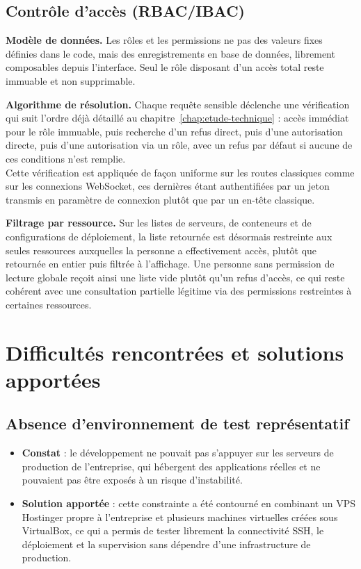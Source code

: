 \subsection{Contrôle d'accès (RBAC/IBAC)}

\textbf{Modèle de données.} Les rôles et les permissions ne pas
des valeurs fixes définies dans le code, mais des enregistrements en
base de données, librement composables depuis l'interface. Seul le rôle
disposant d'un accès total reste immuable et non supprimable.

\textbf{Algorithme de résolution.} Chaque requête sensible déclenche une
vérification qui suit l'ordre déjà détaillé au
chapitre~\ref{chap:etude-technique} : accès immédiat pour le rôle
immuable, puis recherche d'un refus direct, puis d'une autorisation
directe, puis d'une autorisation via un rôle, avec un refus par défaut
si aucune de ces conditions n'est remplie. \\ 
Cette vérification est appliquée de façon uniforme sur les routes classiques comme sur les
connexions WebSocket, ces dernières étant authentifiées par un jeton
transmis en paramètre de connexion plutôt que par un en-tête classique.

\textbf{Filtrage par ressource.} Sur les listes de serveurs, de
conteneurs et de configurations de déploiement, la liste retournée est
désormais restreinte aux seules ressources auxquelles la personne a
effectivement accès, plutôt que retournée en entier puis filtrée à
l'affichage. Une personne sans permission de lecture globale reçoit
ainsi une liste vide plutôt qu'un refus d'accès, ce qui reste cohérent
avec une consultation partielle légitime via des permissions restreintes
à certaines ressources.

\section{Difficultés rencontrées et solutions apportées}

\subsection{Absence d'environnement de test représentatif}

\begin{itemize}
  \item \textbf{Constat} : le développement ne pouvait pas s'appuyer sur
        les serveurs de production de l'entreprise, qui hébergent des
        applications réelles et ne pouvaient pas être exposés à un
        risque d'instabilité.
  \item \textbf{Solution apportée} : cette constrainte a été contourné en
        combinant un VPS Hostinger propre à l'entreprise et plusieurs
        machines virtuelles créées sous VirtualBox, ce qui a permis de
        tester librement la connectivité SSH, le déploiement et la
        supervision sans dépendre d'une infrastructure de production.
\end{itemize}

